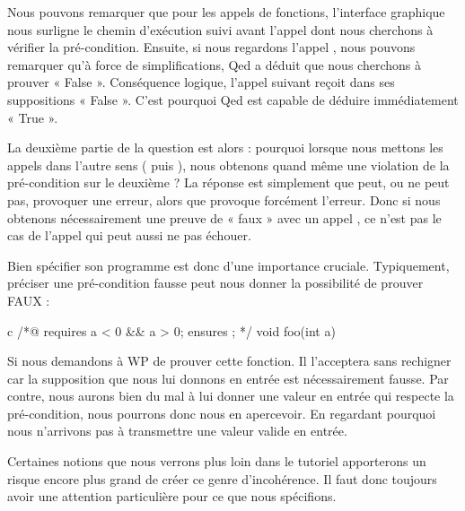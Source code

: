\documentclass[middle]{zmdocument}
\begin{document}
Nous pouvons remarquer que pour les appels de fonctions, l'interface graphique
nous surligne le chemin d'exécution suivi avant l'appel dont nous cherchons à 
vérifier la pré-condition. Ensuite, si nous regardons l'appel ,
nous pouvons remarquer qu'à force de simplifications, Qed a déduit que nous 
cherchons à prouver « False ». Conséquence logique, l'appel suivant  
reçoit dans ses suppositions « False ». C'est pourquoi Qed est capable de déduire
immédiatement « True ».



La deuxième partie de la question est alors : pourquoi lorsque nous mettons les 
appels dans l'autre sens ( puis ), nous obtenons 
quand même une violation de la pré-condition sur le deuxième ? La réponse est 
simplement que  peut, ou ne peut pas, provoquer une erreur, alors 
que  provoque forcément l'erreur. Donc si nous obtenons 
nécessairement une preuve de « faux » avec un appel , ce n'est
pas le cas de l'appel  qui peut aussi ne pas échouer.



Bien spécifier son programme est donc d'une importance cruciale. Typiquement, 
préciser une pré-condition fausse peut nous donner la possibilité de prouver 
FAUX :



\begin{CodeBlock}{c}
/*@
  requires a < 0 && a > 0;
  ensures  \false;
*/
void foo(int a){

}
\end{CodeBlock}



Si nous demandons à WP de prouver cette fonction. Il l'acceptera sans rechigner
car la supposition que nous lui donnons en entrée est nécessairement fausse. Par
contre, nous aurons bien du mal à lui donner une valeur en entrée qui respecte la 
pré-condition, nous pourrons donc nous en apercevoir. En regardant pourquoi nous
n'arrivons pas à transmettre une valeur valide en entrée.



Certaines notions que nous verrons plus loin dans le tutoriel apporterons un 
risque encore plus grand de créer ce genre d'incohérence. Il faut donc toujours
avoir une attention particulière pour ce que nous spécifions.
\end{document}

